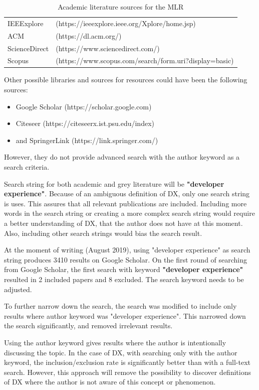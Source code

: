\documentclass[english, 12pt, a4paper, sci, utf8, a-1b, online]{aaltothesis}
\begin{document}
\begin{table}[H]
  \begin{tabular}{ l l }
    IEEExplore    & (https://ieeexplore.ieee.org/Xplore/home.jsp)          \\
    ACM           & (https://dl.acm.org/)                                  \\
    ScienceDirect & (https://www.sciencedirect.com/)                       \\
    Scopus        & (https://www.scopus.com/search/form.uri?display=basic)
  \end{tabular}
  \caption{Academic literature sources for the MLR}
\end{table}

Other possible libraries and sources for resources could have been the following sources:
\begin{itemize}
  \item Google Scholar (https://scholar.google.com)
  \item Citeseer (https://citeseerx.ist.psu.edu/index)
  \item and SpringerLink (https://link.springer.com/)
\end{itemize}

However, they do not provide advanced search with the author keyword as a search criteria.

Search string for both academic and grey literature will be \textbf{"developer experience"}. Because of an ambiguous definition of DX, only one search string is uses. This assures that all relevant publications are included. Including more words in the search string or creating a more complex search string would require a better understanding of DX, that the author does not have at this moment. Also, including other search strings would bias the search result.

At the moment of writing (August 2019), using "developer experience" as search string produces 3410 results on Google Scholar. On the first round of searching from Google Scholar, the first search with keyword \textbf{"developer experience"} resulted in 2 included papers and 8 excluded. The search keyword needs to be adjusted.

To further narrow down the search, the search was modified to include only results where author keyword was "developer experience". This narrowed down the search significantly, and removed irrelevant results.

Using the author keyword gives results where the author is intentionally discussing the topic. In the case of DX, with searching only with the author keyword, the inclusion/exclusion rate is significantly better than with a full-text search. However, this approach will remove the possibility to discover definitions of DX where the author is not aware of this concept or phenomenon.
\end{document}
